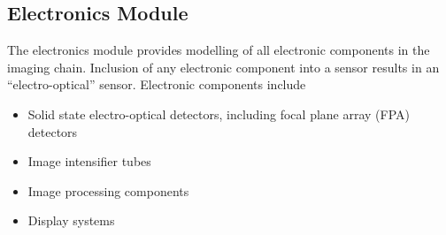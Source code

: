 \documentclass[a4paper,10pt,english]{sphinxmanual}
\begin{document}
\subsection{Electronics Module}
\label{packages:electronics-module}\label{packages:id3}
The electronics module provides modelling of all electronic components in the imaging chain. Inclusion
of any electronic component into a sensor results in an ``electro-optical'' sensor. Electronic components include
\begin{itemize}
\item {} 
Solid state electro-optical detectors, including focal plane array (FPA) detectors

\item {} 
Image intensifier tubes

\item {} 
Image processing components

\item {} 
Display systems

\end{itemize}
\label{packages:module-electro}
\end{document}
